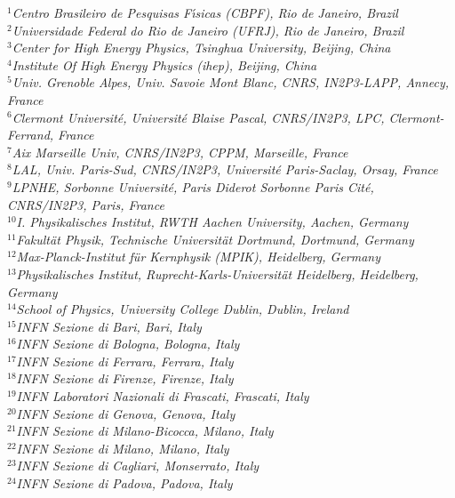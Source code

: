 \begin{flushleft}
{\footnotesize \it
$ ^{1}$Centro Brasileiro de Pesquisas F{\'\i}sicas (CBPF), Rio de Janeiro, Brazil\\
$ ^{2}$Universidade Federal do Rio de Janeiro (UFRJ), Rio de Janeiro, Brazil\\
$ ^{3}$Center for High Energy Physics, Tsinghua University, Beijing, China\\
$ ^{4}$Institute Of High Energy Physics (ihep), Beijing, China\\
$ ^{5}$Univ. Grenoble Alpes, Univ. Savoie Mont Blanc, CNRS, IN2P3-LAPP, Annecy, France\\
$ ^{6}$Clermont Universit{\'e}, Universit{\'e} Blaise Pascal, CNRS/IN2P3, LPC, Clermont-Ferrand, France\\
$ ^{7}$Aix Marseille Univ, CNRS/IN2P3, CPPM, Marseille, France\\
$ ^{8}$LAL, Univ. Paris-Sud, CNRS/IN2P3, Universit{\'e} Paris-Saclay, Orsay, France\\
$ ^{9}$LPNHE, Sorbonne Universit{\'e}, Paris Diderot Sorbonne Paris Cit{\'e}, CNRS/IN2P3, Paris, France\\
$ ^{10}$I. Physikalisches Institut, RWTH Aachen University, Aachen, Germany\\
$ ^{11}$Fakult{\"a}t Physik, Technische Universit{\"a}t Dortmund, Dortmund, Germany\\
$ ^{12}$Max-Planck-Institut f{\"u}r Kernphysik (MPIK), Heidelberg, Germany\\
$ ^{13}$Physikalisches Institut, Ruprecht-Karls-Universit{\"a}t Heidelberg, Heidelberg, Germany\\
$ ^{14}$School of Physics, University College Dublin, Dublin, Ireland\\
$ ^{15}$INFN Sezione di Bari, Bari, Italy\\
$ ^{16}$INFN Sezione di Bologna, Bologna, Italy\\
$ ^{17}$INFN Sezione di Ferrara, Ferrara, Italy\\
$ ^{18}$INFN Sezione di Firenze, Firenze, Italy\\
$ ^{19}$INFN Laboratori Nazionali di Frascati, Frascati, Italy\\
$ ^{20}$INFN Sezione di Genova, Genova, Italy\\
$ ^{21}$INFN Sezione di Milano-Bicocca, Milano, Italy\\
$ ^{22}$INFN Sezione di Milano, Milano, Italy\\
$ ^{23}$INFN Sezione di Cagliari, Monserrato, Italy\\
$ ^{24}$INFN Sezione di Padova, Padova, Italy\\
}
\end{flushleft}
